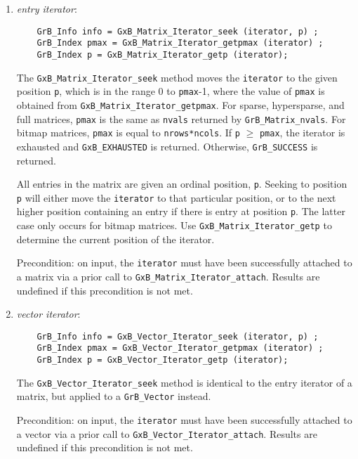 \documentclass[12pt]{article}
\begin{document}
\begin{enumerate}
    \item {\em entry iterator}:
    {\footnotesize
    \begin{verbatim}
    GrB_Info info = GxB_Matrix_Iterator_seek (iterator, p) ;
    GrB_Index pmax = GxB_Matrix_Iterator_getpmax (iterator) ;
    GrB_Index p = GxB_Matrix_Iterator_getp (iterator); \end{verbatim}}

        The \verb'GxB_Matrix_Iterator_seek' method moves the \verb'iterator' to
        the given position \verb'p', which is in the range 0 to \verb'pmax'-1,
        where the value of \verb'pmax' is obtained from
        \verb'GxB_Matrix_Iterator_getpmax'.
        For sparse, hypersparse, and full matrices, \verb'pmax' is the same as
        \verb'nvals' returned by \verb'GrB_Matrix_nvals'.  For bitmap matrices,
        \verb'pmax' is equal to \verb'nrows*ncols'.  If \verb'p' $\ge$
        \verb'pmax', the iterator is exhausted and \verb'GxB_EXHAUSTED' is
        returned.  Otherwise, \verb'GrB_SUCCESS' is returned.

        All entries in the matrix are given an ordinal position, \verb'p'.
        Seeking to position \verb'p' will either move the \verb'iterator' to
        that particular position, or to the next higher position containing an
        entry if there is entry at position \verb'p'.  The latter case only
        occurs for bitmap matrices.
        Use \verb'GxB_Matrix_Iterator_getp' to determine the current
        position of the iterator.

        Precondition: on input, the \verb'iterator' must have been successfully
        attached to a matrix via a prior call to
        \verb'GxB_Matrix_Iterator_attach'.  Results are undefined if this
        precondition is not met.

    \item {\em vector iterator}:
    {\footnotesize
    \begin{verbatim}
    GrB_Info info = GxB_Vector_Iterator_seek (iterator, p) ;
    GrB_Index pmax = GxB_Vector_Iterator_getpmax (iterator) ;
    GrB_Index p = GxB_Vector_Iterator_getp (iterator); \end{verbatim}}

        The \verb'GxB_Vector_Iterator_seek' method is identical to the
        entry iterator of a matrix, but applied to a \verb'GrB_Vector' instead.

        Precondition: on input, the \verb'iterator' must have been successfully
        attached to a vector via a prior call to
        \verb'GxB_Vector_Iterator_attach'.  Results are undefined if this
        precondition is not met.

    \end{enumerate}
\end{document}
